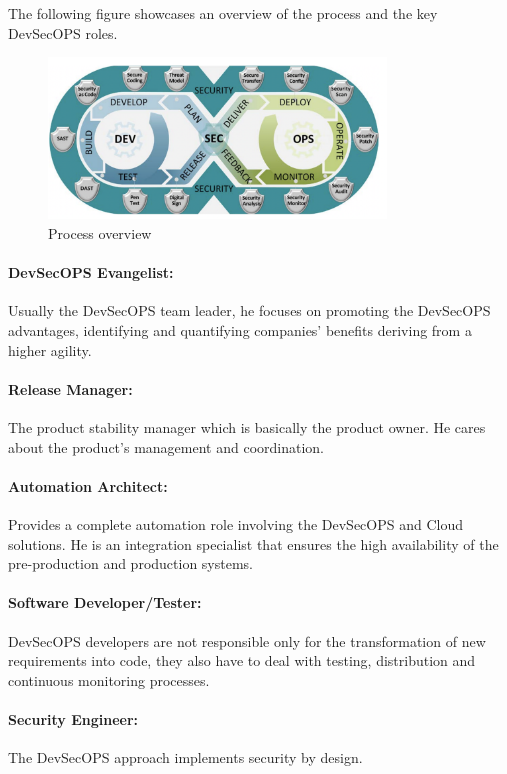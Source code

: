 The following figure showcases an overview of the process and the key DevSecOPS roles. 

\begin{figure}[!ht]\centering
\includegraphics[width=0.8\textwidth,angle=00]{assets/f1.png}
\caption{Process overview}
\label{fig:processOverview}
\end{figure}


\paragraph{DevSecOPS Evangelist:} 
Usually the DevSecOPS team leader, he focuses on promoting the DevSecOPS advantages, identifying and quantifying companies’ benefits deriving from a higher agility. 

\paragraph{Release Manager:} 
The product stability manager which is basically the product owner. He cares about the product’s management and coordination. 

\paragraph{Automation Architect: }
Provides a complete automation role involving the DevSecOPS and Cloud solutions. He is an integration specialist that ensures the high availability of the pre-production and production systems. 

\paragraph{Software Developer/Tester:}
DevSecOPS developers are not responsible only for the transformation of new requirements into code, they also have to deal with testing, distribution and continuous monitoring processes.

\paragraph{Security Engineer: }
The DevSecOPS approach implements security by design.



